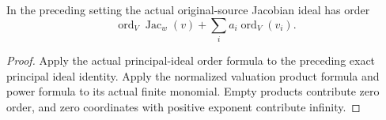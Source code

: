 \begin{corollary}\label{cor:sc0-dvr-leaf-source-jacobian-order}
\leanok
{}
In the preceding setting the actual original-source Jacobian ideal has order
\[
 \operatorname{ord}_V\operatorname{Jac}_w(v)
 +\sum_i a_i\operatorname{ord}_V(v_i).
\]
\end{corollary}
\begin{proof}
Apply the actual principal-ideal order formula to the preceding exact
principal ideal identity. Apply the normalized valuation product formula
and power formula to its actual finite monomial. Empty products contribute
zero order, and zero coordinates with positive exponent contribute infinity.
\end{proof}
